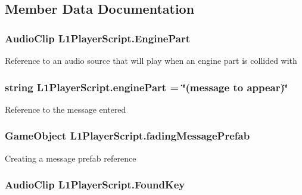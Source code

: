 \subsection{Member Data Documentation}
\hypertarget{class_l1_player_script_a8de3ae6c3ec4bc6e6df11cb70ce2a23a}{
\subsubsection[{Engine\-Part}]{\setlength{\rightskip}{0pt plus 5cm}Audio\-Clip L1\-Player\-Script.\-Engine\-Part}}\label{class_l1_player_script_a8de3ae6c3ec4bc6e6df11cb70ce2a23a}
Reference to an audio source that will play when an engine part is collided with \hypertarget{class_l1_player_script_afbc69f415412daadff795372b4336ab9}{
\subsubsection[{engine\-Part}]{\setlength{\rightskip}{0pt plus 5cm}string L1\-Player\-Script.\-engine\-Part = \char`\"{}(message to appear)\char`\"{}}}\label{class_l1_player_script_afbc69f415412daadff795372b4336ab9}
Reference to the message entered \hypertarget{class_l1_player_script_abe4e76e0f60f25ca1301c7bf73b10afe}{
\subsubsection[{fading\-Message\-Prefab}]{\setlength{\rightskip}{0pt plus 5cm}Game\-Object L1\-Player\-Script.\-fading\-Message\-Prefab}}\label{class_l1_player_script_abe4e76e0f60f25ca1301c7bf73b10afe}
Creating a message prefab reference \hypertarget{class_l1_player_script_a16ab44f36ede46fcee2935528bf69fde}{
\subsubsection[{Found\-Key}]{\setlength{\rightskip}{0pt plus 5cm}Audio\-Clip L1\-Player\-Script.\-Found\-Key}}\label{class_l1_player_script_a16ab44f36ede46fcee2935528bf69fde}
